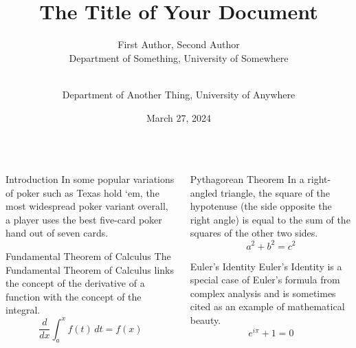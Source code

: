 \documentclass[final]{beamer}
\title{The Title of Your Document}
\author{
    First Author, Second Author \\
    Department of Something, University of Somewhere \and \\
    Department of Another Thing, University of Anywhere
}
\date{March 27, 2024} %
\begin{document}
\maketitle


\begin{frame}[t]
\begin{columns}[t]

\begin{column}{.48\linewidth}


\begin{block}{Introduction}
    In some popular variations of poker such as Texas hold `em, 
    the most widespread poker variant overall, a player uses the best five-card poker hand out of seven cards.
\end{block}

\begin{block}{Fundamental Theorem of Calculus}
The Fundamental Theorem of Calculus links the concept of the derivative of a function with the concept of the integral.
\[
\frac{d}{dx} \int_a^x f(t)\, dt = f(x)
\]
\end{block}
\end{column}

\begin{column}{.48\linewidth}
\begin{block}{Pythagorean Theorem}
In a right-angled triangle, the square of the hypotenuse (the side opposite the right angle) is equal to the sum of the squares of the other two sides.
\[
a^2 + b^2 = c^2
\]
\end{block}

\begin{block}{Euler's Identity}
Euler's Identity is a special case of Euler's formula from complex analysis and is sometimes cited as an example of mathematical beauty.
\[
e^{i\pi} + 1 = 0
\]
\end{block}
\end{column}


\end{columns}
\end{frame}
\end{document}
